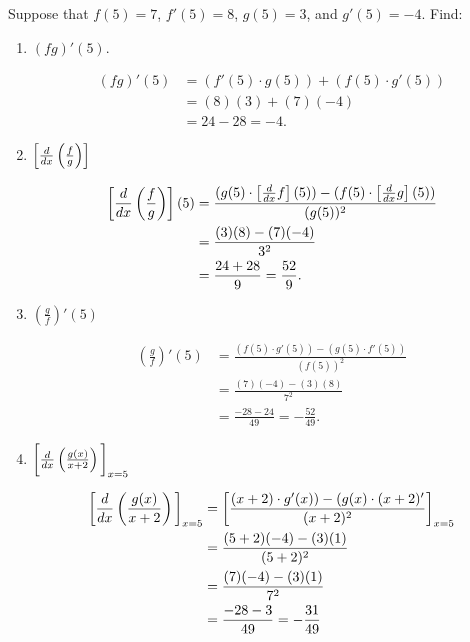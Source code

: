 \documentclass[nooutcomes]{ximera}
\begin{document}
\begin{problem}
Suppose that $f(5) = 7$, $f'(5) = 8$, $g(5) = 3$, and $g'(5) = -4$.  Find:

	\begin{enumerate}

	\item  $(fg)'(5)$.
		\begin{freeResponse}
		\begin{align*}
		(fg)'(5) &= (f'(5) \cdot g(5)) + (f(5) \cdot g'(5))  \\
		&= (8)(3) + (7)(-4)  \\
		&= 24 - 28 = -4.
		\end{align*}
		\end{freeResponse}
		
		

	\item $\left[ \frac{d}{dx} \left( \frac{f}{g} \right) \right]$
		\begin{freeResponse}
		\begin{align*}
		\left[ \frac{d}{dx} \left( \frac{f}{g} \right) \right] (5) &= \frac{(g(5) \cdot \left[ \frac{d}{dx} f \right] (5)) - (f(5) \cdot \left[ \frac{d}{dx} g \right](5))}{(g(5))^2}  \\
		&= \frac{(3)(8) - (7)(-4)}{3^2}  \\
		&= \frac{24 + 28}{9} = \frac{52}{9}.
		\end{align*}
		\end{freeResponse}
		
		
	\item $ \left( \frac{g}{f} \right)' (5)$
		\begin{freeResponse}
		\begin{align*}
		\left( \frac{g}{f} \right)' (5) &= \frac{(f(5) \cdot g'(5)) - (g(5) \cdot f'(5))}{(f(5))^2}  \\
		&= \frac{(7)(-4) - (3)(8)}{7^2}  \\
		&= \frac{-28 - 24}{49} = - \frac{52}{49}.
		\end{align*}
		\end{freeResponse}
		
	\item  $\bigg[  \frac{d}{dx} \left( \frac{g(x)}{x+2} \right) \bigg]_{x=5}$
		\begin{freeResponse}
		\begin{align*}
		\bigg[ \frac{d}{dx} \left( \frac{g(x)}{x+2} \right) \bigg]_{x=5} &= \bigg[ \frac{(x+2) \cdot g'(x)) - (g(x) \cdot (x+2)'}{(x+2)^2} \bigg]_{x=5}  \\
		&= \frac{(5+2)(-4) - (3)(1)}{(5+2)^2}  \\
		&= \frac{(7)(-4) - (3)(1)}{7^2}  \\
		&= \frac{-28 - 3}{49} = - \frac{31}{49}
		\end{align*}
		\end{freeResponse}




\end{enumerate}
\end{problem}
\end{document}
